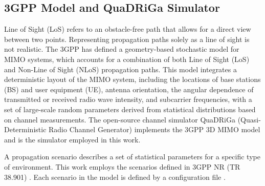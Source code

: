 \subsection{3GPP Model and QuaDRiGa Simulator}

Line of Sight (LoS) refers to an obstacle-free path that allows for a direct view between two points. Representing propagation paths solely as a line of sight is not realistic. The 3GPP has defined a geometry-based stochastic model for MIMO systems, which accounts for a combination of both Line of Sight (LoS) and Non-Line of Sight (NLoS) propagation paths. This model integrates a deterministic layout of the MIMO system, including the locations of base stations (BS) and user equipment (UE), antenna orientation, the angular dependence of transmitted or received radio wave intensity, and subcarrier frequencies, with a set of large-scale random parameters derived from statistical distributions based on channel measurements. The open-source channel simulator QuaDRiGa (Quasi-Deterministic Radio Channel Generator) implements the 3GPP 3D MIMO model \cite{bjornson-mimo} and is the simulator employed in this work.

A propagation scenario describes a set of statistical parameters for a specific type of environment. This work employs the scenarios defined in 3GPP NR (TR 38.901) \cite{3gpp-tr38901}. Each scenario in the model is defined by a configuration file \cite{quadriga-manual}.

